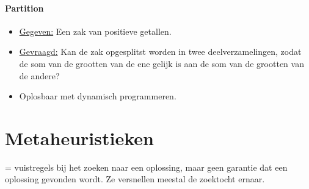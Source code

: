 \documentclass{report}
\begin{document}
\subsubsection{Partition}
\begin{itemize}
	\item[\info] \underline{Gegeven:} Een zak van positieve getallen.
	\item[\info] \underline{Gevraagd:} Kan de zak opgesplitst worden in twee deelverzamelingen, zodat de som van de grootten van de ene gelijk is aan de som van de grootten van de andere?
	\item[\info] Oplosbaar met dynamisch programmeren.

\end{itemize}
\chapter{Metaheuristieken}
= vuistregels bij het zoeken naar een oplossing, maar geen garantie dat een oplossing gevonden wordt. Ze versnellen meestal de zoektocht ernaar.
\end{document}
